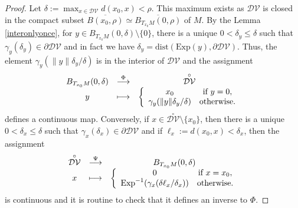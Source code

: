\documentclass[11pt,twoside]{amsart}
\theoremstyle{plain}
\newcommand{\longto}{\longrightarrow}
\begin{document}
\begin{proof}
Let $\delta:=\max_{x\in\mathcal{DV}}d(x_0,x)<\rho$. This maximum exists as $\mathcal{DV}$ is closed in the compact subset $\overline{B(x_0,\rho)}\simeq\overline{B_{T_{x_0}M}(0,\rho)}$ of $M$. By the Lemma \ref{interonlyonce}, for $y\in B_{T_{x_0}M}(0,\delta)\setminus\{0\}$, there is a unique $0<\delta_y\le\delta$ such that $\gamma_y(\delta_y)\in\partial\mathcal{DV}$ and in fact we have $\delta_y=\mathrm{dist}(\mathrm{Exp}(y),\partial\mathcal{DV})$. Thus, the element $\gamma_y({\|y\|\delta_y}/{\delta})$ is in the interior of $\mathcal{DV}$ and the assignment
\[\begin{array}{ccc}
B_{T_{x_0}M}(0,\delta) & \stackrel{\tiny{\Phi}}\longto & \stackrel{\circ}{\mathcal{DV}} \\ y & \longmapsto & \left\{\begin{array}{cc}
x_0 & \text{if }y=0,\\
\gamma_y({\|y\|\delta_y}/{\delta}) & \text{otherwise.}\end{array}\right.\end{array}\]
defines a continuous map. Conversely, if $x\in \stackrel{\circ}{\mathcal{DV}}\setminus\{x_0\}$, then there is a unique $0<\delta_x\le\delta$ such that $\gamma_x(\delta_x)\in\partial\mathcal{DV}$ and if $\ell_x:=d(x_0,x)<\delta_x$, then the assignment
\[\begin{array}{ccc}
\stackrel{\circ}{\mathcal{DV}} & \stackrel{\tiny{\Psi}}\longto & B_{T_{x_0}M}(0,\delta) \\ x & \longmapsto & \left\{\begin{array}{cc}
0 & \text{if }x=x_0, \\
\mathrm{Exp}^{-1}(\gamma_x(\delta\ell_x/\delta_x)) & \text{otherwise.}\end{array}\right.\end{array}\]
is continuous and it is routine to check that it defines an inverse to $\Phi$.
\end{proof}
\fi
\end{document}
